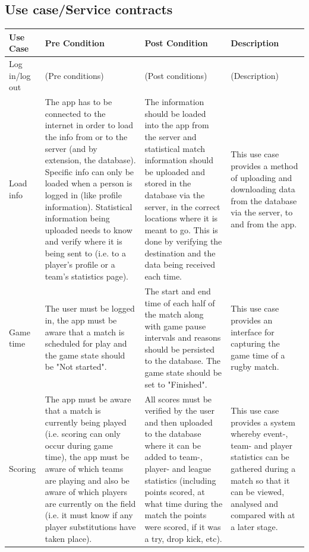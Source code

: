 \documentclass[a4paper,12pt]{report}
\begin{document}
\subsection{Use case/Service contracts}
\begin{center}
  \begin{longtable}{| p{3cm} | p{4cm} | p{4cm} | p{4cm} |}
    \hline
    Use Case & Pre Condition & Post Condition & Description \\ 
    \hline \hline
    Log in/log out & (Pre conditions) & (Post conditions) & (Description)\\ 
    \hline
    Load info & The app has to be connected to the internet in order to load the info from or to the server (and by extension, the database). Specific info can only be loaded when a person is logged in (like profile information). Statistical information being uploaded needs to know and verify where it is being sent to (i.e. to a player's profile or a team's statistics page). & The information should be loaded into the app from the server and statistical match information should be uploaded and stored in the database via the server, in the correct locations where it is meant to go. This is done by verifying the destination and the data being received each time. & This use case provides a method of uploading and downloading data from the database via the server, to and from the app. \\ 
    \hline
    Game time & The user must be logged in, the app must be aware that a match is scheduled for play and the game state should be "Not started". & The start and end time of each half of the match along with game pause intervals and reasons should be persisted to the database. The game state should be set to "Finished".  & This use case provides an interface for capturing the game time of a rugby match. \\ 
    \hline
    Scoring & The app must be aware that a match is currently being played (i.e. scoring can only occur during game time), the app must be aware of which teams are playing and also be aware of which players are currently on the field (i.e. it must know if any player substitutions have taken place). & All scores must be verified by the user and then uploaded to the database where it can be added to team-, player- and league statistics (including points scored, at what time during the match the points were scored, if it was a try, drop kick, etc). & This use case provides a system whereby event-, team- and player statistics can be gathered during a match so that it can be viewed, analysed and compared with at a later stage.\\ \hline

\end{longtable}
\end{center}
\end{document}
